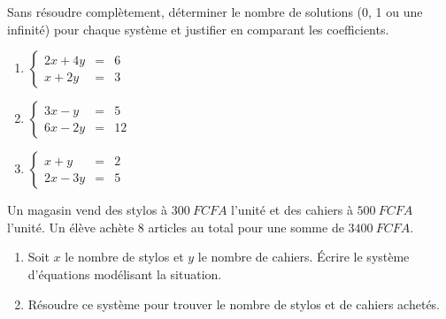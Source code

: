 \documentclass[11pt]{article}
\begin{document}
\begin{exercice}
Sans résoudre complètement, déterminer le nombre de solutions (0, 1 ou une infinité) pour chaque système et justifier en comparant les coefficients.
\begin{enumerate}
    \item $\left\{ \begin{array}{rcl} 2x + 4y &=& 6 \\ x + 2y &=& 3 \end{array} \right.$
    \item $\left\{ \begin{array}{rcl} 3x - y &=& 5 \\ 6x - 2y &=& 12 \end{array} \right.$
    \item $\left\{ \begin{array}{rcl} x + y &=& 2 \\ 2x - 3y &=& 5 \end{array} \right.$
\end{enumerate}
\end{exercice}

\begin{exercice}
Un magasin vend des stylos à $\SI{300}{FCFA}$ l'unité et des cahiers à $\SI{500}{FCFA}$ l'unité. Un élève achète 8 articles au total pour une somme de $\SI{3400}{FCFA}$.
\begin{enumerate}
    \item Soit $x$ le nombre de stylos et $y$ le nombre de cahiers. Écrire le système d'équations modélisant la situation.
    \item Résoudre ce système pour trouver le nombre de stylos et de cahiers achetés.
\end{enumerate}
\end{exercice}
\end{document}
